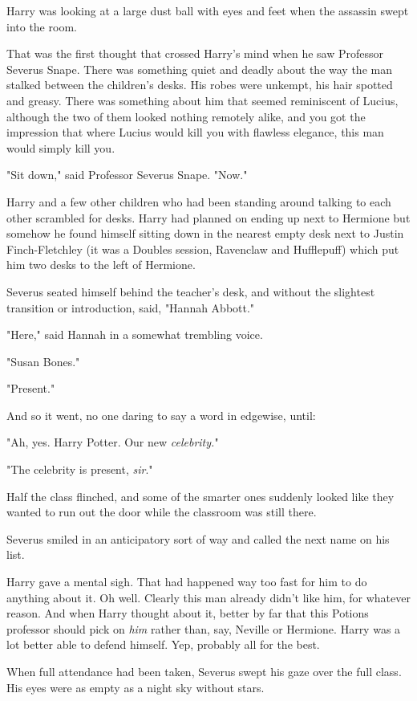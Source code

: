 Harry was looking at a large dust ball with eyes and feet when the assassin
swept into the room.

That was the first thought that crossed Harry's mind when he saw Professor
Severus Snape. There was something quiet and deadly about the way the man
stalked between the children's desks. His robes were unkempt, his hair spotted
and greasy. There was something about him that seemed reminiscent of Lucius,
although the two of them looked nothing remotely alike, and you got the
impression that where Lucius would kill you with flawless elegance, this man
would simply kill you.

"Sit down," said Professor Severus Snape. "Now."

Harry and a few other children who had been standing around talking to each
other scrambled for desks. Harry had planned on ending up next to Hermione but
somehow he found himself sitting down in the nearest empty desk next to Justin
Finch-Fletchley (it was a Doubles session, Ravenclaw and Hufflepuff) which put
him two desks to the left of Hermione.

Severus seated himself behind the teacher's desk, and without the slightest
transition or introduction, said, "Hannah Abbott."

"Here," said Hannah in a somewhat trembling voice.

"Susan Bones."

"Present."

And so it went, no one daring to say a word in edgewise, until:

"Ah, yes. Harry Potter. Our new{\el} \emph{celebrity.}"

"The celebrity is present, \emph{sir}."

Half the class flinched, and some of the smarter ones suddenly looked like they
wanted to run out the door while the classroom was still there.

Severus smiled in an anticipatory sort of way and called the next name on his
list.

Harry gave a mental sigh. That had happened way too fast for him to do anything
about it. Oh well. Clearly this man already didn't like him, for whatever
reason. And when Harry thought about it, better by far that this Potions
professor should pick on \emph{him} rather than, say, Neville or Hermione.
Harry was a lot better able to defend himself. Yep, probably all for the best.

When full attendance had been taken, Severus swept his gaze over the full
class. His eyes were as empty as a night sky without stars.


